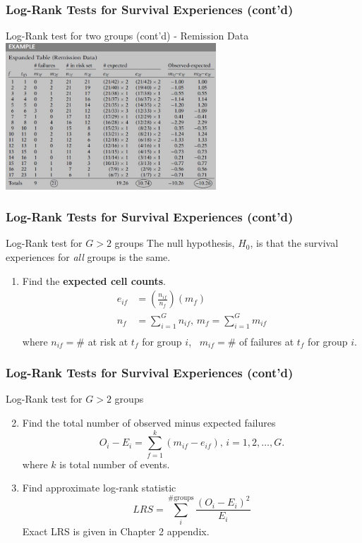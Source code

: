 \documentclass{beamer}
\theoremstyle{definition}
\begin{document}
\begin{frame}
\frametitle{Log-Rank Tests for Survival Experiences (cont'd)}
\begin{block}{Log-Rank test for two groups (cont'd) - Remission Data}
\includegraphics[width =\textwidth, height=5.5cm]{CH2_ComputeLR}
\end{block}
\end{frame}


\begin{frame}
\frametitle{Log-Rank Tests for Survival Experiences (cont'd)}
\begin{block}{Log-Rank test for $G>2$ groups}
The null hypothesis, $H_0$, is that the survival experiences for \textit{all} groups is the same.
\begin{enumerate}
\item Find the \textbf{expected cell counts}.
\begin{align*}
e_{if} & = \left(\frac{n_{if}}{n_{f}}\right)(m_{f}) \\
n_{f} & = \sum_{i=1}^G n_{if}, \, m_f =  \sum_{i=1}^G m_{if}\\
\end{align*}
where $n_{if}=$\# at risk at $t_f$ for group $i$, \, $m_{if}=$\# of failures at $t_f$ for group $i$.
\end{enumerate}
\end{block}
\end{frame}

\begin{frame}
\frametitle{Log-Rank Tests for Survival Experiences (cont'd)}
\begin{block}{Log-Rank test for $G>2$ groups}
\begin{enumerate}
 \setcounter{enumi}{1}
\item Find the total number of observed minus expected failures
\[
O_i - E_i = \sum_{f=1}^k (m_{if} - e_{if}), \, i=1,2, \ldots, G.
\]
where $k$ is total number of events.
\item Find approximate log-rank statistic
\[
LRS = \sum_i^{\text{\# groups}} \frac{(O_i - E_i)^2}{E_i}
\]
Exact LRS is given in Chapter 2 appendix.
\end{enumerate}
\end{block}
\end{frame}
\end{document}
